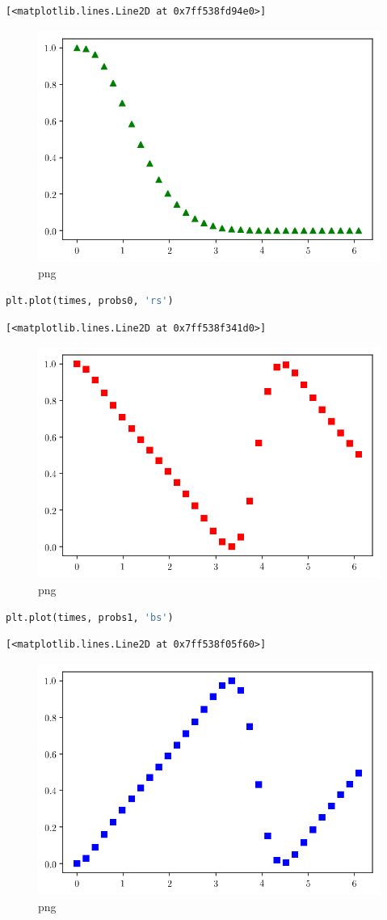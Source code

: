 \begin{lstlisting}
[<matplotlib.lines.Line2D at 0x7ff538fd94e0>]
\end{lstlisting}

\begin{figure}
\centering
\includegraphics[width=0.6\linewidth]{output_89_1.png}
\caption{png}
\end{figure}

\begin{lstlisting}[language=Python]
plt.plot(times, probs0, 'rs')
\end{lstlisting}

\begin{lstlisting}
[<matplotlib.lines.Line2D at 0x7ff538f341d0>]
\end{lstlisting}

\begin{figure}
\centering
\includegraphics[width=0.6\linewidth]{output_90_1.png}
\caption{png}
\end{figure}

\begin{lstlisting}[language=Python]
plt.plot(times, probs1, 'bs')
\end{lstlisting}

\begin{lstlisting}
[<matplotlib.lines.Line2D at 0x7ff538f05f60>]
\end{lstlisting}

\begin{figure}
\centering
\includegraphics[width=0.6\linewidth]{output_91_1.png}
\caption{png}
\end{figure}

